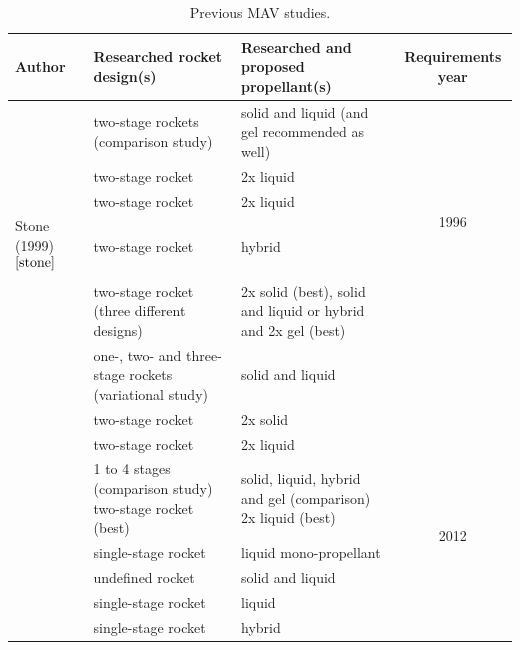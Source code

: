 \begin{table}[H]
\begin{center}
\caption{Previous \ac{MAV} studies.}
\label{tab:refmavstud}
\begin{tabularx}{1.0\textwidth}{|X|X|X|c|}
\hline 
\textbf{Author} 		 &\textbf{Researched rocket design(s)} & \textbf{Researched and proposed propellant(s)} & \textbf{Requirements year} \\ \hline \hline
\cite{whitehead1997} 		& two-stage rockets (comparison study)  & solid and liquid (and gel recommended as well) & \multirow{5}{*}{1996} \\ \cline{1-3}
\cite{guernsey1998} 		& two-stage rocket & 2x liquid &  \\ \cline{1-3}
\cite{desai1998} 	& two-stage rocket & 2x liquid  & \\ \cline{1-3}
Stone (1999)$^{\ref{stone}}$  & two-stage rocket & hybrid & \\ \hline \hline
\cite{stephenson2002} 		& two-stage rocket (three different designs) & 2x solid (best), solid and liquid or hybrid and 2x gel (best)  & \multirow{8}{*}{2000} \\ \cline{1-3}
\cite{whitehead2005} 		& one-, two- and three-stage rockets (variational study)  & solid and liquid  & \\ \cline{1-3}
\cite{stephenson2006} & two-stage rocket & 2x solid & \\ \hline \hline
\cite{sengupta2012} 		& two-stage rocket & 2x liquid  & \multirow{7}{*}{2012} \\ \cline{1-3}
\cite{trinidad2012} 		& 1 to 4 stages (comparison study) two-stage rocket (best)  & solid, liquid, hybrid and gel (comparison) 2x liquid (best) & \\ \cline{1-3}
\cite{mungas2012}	& single-stage rocket & liquid mono-propellant  &  \\ \cline{1-3}
\cite{mppg2012}	 & undefined rocket & solid and liquid & \\ \hline \hline
\cite{vaughan2016technology} & single-stage rocket & liquid & \multirow{2}{*}{2014} \\ \cline{1-3}
\cite{karp2016technology} & single-stage rocket & hybrid & \\ \hline
 		
\end{tabularx}
\end{center}
\end{table} 



